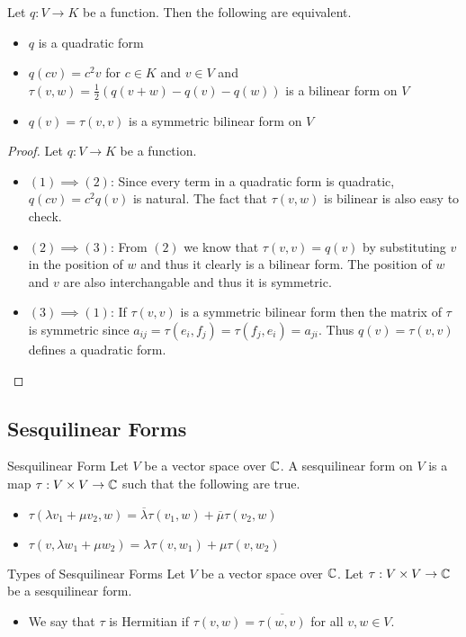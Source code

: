 \documentclass[a4paper]{article}
\begin{document}
\begin{prp}{}{} Let $q:V\to K$ be a function. Then the following are equivalent. 
\begin{itemize}
\item $q$ is a quadratic form
\item $q(cv)=c^2v$ for $c\in K$ and $v\in V$ and $\tau(v,w)=\frac{1}{2}(q(v+w)-q(v)-q(w))$ is a bilinear form on $V$
\item $q(v)=\tau(v,v)$ is a symmetric bilinear form on $V$
\end{itemize} 
\begin{proof}
Let $q:V\to K$ be a function. 
\begin{itemize}
\item $(1)\implies (2)$: Since every term in a quadratic form is quadratic, $q(cv)=c^2q(v)$ is natural. The fact that $\tau(v,w)$ is bilinear is also easy to check. 
\item $(2)\implies (3)$: From $(2)$ we know that $\tau(v,v)=q(v)$ by substituting $v$ in the position of $w$ and thus it clearly is a bilinear form. The position of $w$ and $v$ are also interchangable and thus it is symmetric. 
\item $(3)\implies (1)$: If $\tau(v,v)$ is a symmetric bilinear form then the matrix of $\tau$ is symmetric since $a_{ij}=\tau(e_i,f_j)=\tau(f_j,e_i)=a_{ji}$. Thus $q(v)=\tau(v,v)$ defines a quadratic form. 
\end{itemize}
\end{proof}
\end{prp}

\subsection{Sesquilinear Forms}
\begin{defn}{Sesquilinear Form}{} Let $V$ be a vector space over $\mathbb{C}$. A sesquilinear form on $V$ is a map $\tau:V\times V\to\mathbb{C}$ such that the following are true. 
\begin{itemize}
\item $\tau(\lambda v_1+\mu v_2,w)=\overline{\lambda}\tau(v_1,w)+\overline{\mu}\tau(v_2,w)$
\item $\tau(v,\lambda w_1+\mu w_2)=\lambda\tau(v,w_1)+\mu\tau(v,w_2)$
\end{itemize}
\end{defn}

\begin{defn}{Types of Sesquilinear Forms}{} Let $V$ be a vector space over $\mathbb{C}$. Let $\tau:V\times V\to\mathbb{C}$ be a sesquilinear form. 
\begin{itemize}
\item We say that $\tau$ is Hermitian if $\tau(v,w)=\overline{\tau(w,v)}$ for all $v,w\in V$. 
\end{itemize}
\end{defn}
\end{document}
